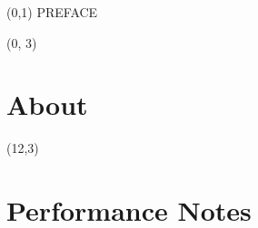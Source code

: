 \documentclass[10pt]{article}
\begin{document}
\begin{textblock}{23}(0,1)
\center\huge PREFACE
\end{textblock}

\begin{textblock}{11}(0, 3)

\section{About}

\end{textblock}

\begin{textblock}{11}(12,3)

\section{Performance Notes}

\end{textblock}
\end{document}
